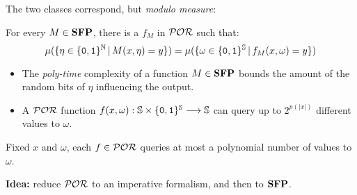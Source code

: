 \documentclass[xcolor={x11names}]{beamer}
\begin{document}
\begin{frame}
\begin{overprint}
	The two classes correspond, but  \emph{modulo measure}:

  \begin{lemma}
    For every $M \in \mathbf{SFP}$, there is a $f_M$ in $\mathcal{POR}$ such that:
	  $$\mu(\{\eta\in \{\mathtt{0}, \mathtt{1}\}^{\mathbb{N}}\,|\, M(x, \eta)=y\})=\mu(\{\omega\in \{\mathtt{0}, \mathtt{1}\}^{\mathbb{S}}\,|\, f_M(x, \omega)=y\})
    $$
	\end{lemma}
	\medskip


	\begin{itemize}
	\item The \emph{poly-time} complexity of a function $M \in \mathbf{SFP}$ bounds the amount of the random bits of $\eta$ influencing the output.
	\item A $\mathcal{POR}$ function $f(x, \omega): \mathbb{S} \times \{\mathtt{0}, \mathtt{1}\}^{\mathbb{S}} \longrightarrow \mathbb{S}$ can query up to $2^{p(|x|)}$ different values to $\omega$.
	\end{itemize}

  \bigskip

  Fixed $x$ and $\omega$, each $f \in \mathcal{POR}$ queries at most a polynomial number of values to $\omega$.\\

  \bigskip

  \textbf{Idea:} reduce $\mathcal{POR}$ to an imperative formalism, and then to $\mathbf{SFP}$.


\end{overprint}
\end{frame}
\end{document}
